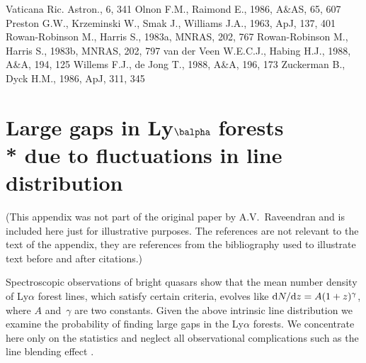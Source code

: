 \documentclass[useAMS,usenatbib]{mn2e}
\begin{document}
\begin{thebibliography}{99}
Vaticana Ric. Astron., 6, 341
 Olnon F.M., Raimond E., 1986,
A\&AS, 65, 607
 Preston G.W., Krzeminski W., Smak J.,
Williams J.A., 1963, ApJ, 137, 401
 Rowan-Robinson M., Harris
S., 1983a, MNRAS, 202, 767
 Rowan-Robinson M., Harris
S., 1983b, MNRAS, 202, 797
 van der Veen W.E.C.J., Habing
H.J., 1988, A\&A, 194, 125
 Willems F.J., de Jong T., 1988,
A\&A, 196, 173
 Zuckerman B., Dyck H.M., 1986, ApJ,
311, 345
\end{thebibliography}

\appendix

\section[]{Large gaps in L\lowercase{y}${\balpha}$ forests\\* due to fluctuations in line distribution}

(This appendix was not part of the original paper by
A.V.~Raveendran and is included here just for illustrative
purposes. The references are not relevant to the text of the
appendix, they are references from the bibliography used to
illustrate text before and after citations.)

Spectroscopic observations of bright quasars show that the mean
number density of Ly$\alpha$ forest lines, which satisfy certain
criteria, evolves like ${\mathrm{d}}N/{\mathrm{d}}z=A(1+z)^\gamma$, where
$A$ and~$\gamma$ are two constants.  Given the above intrinsic
line distribution we examine the probability of finding large gaps
in the Ly$\alpha$ forests.  We concentrate here only on the
statistics and neglect all observational complications such as the
line blending effect \citep[see][for example]{b11}.
\end{document}
